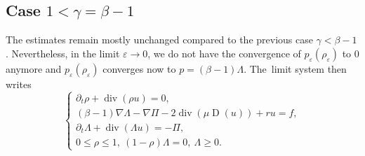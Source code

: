 \documentclass[JEP,XML,SOM,Unicode,NoEqCountersInSection]{cedram}
\newcommand{\<}{\bigl\langle}
\renewcommand{\>}{\bigr\rangle}
\newcommand{\labeleq}[1]{}
\newenvironment{subnumcasess}{\begin{equation*}\begin{cases}}{\end{cases}\end{equation*}}
\theoremstyle{definition}
\theoremstyle{remark}
\DeclareMathOperator{\Div}{div}
\DeclareMathOperator{\D}{D}
\let\ep\varepsilon
\begin{document}
\subsection{Case $1<\gamma = \beta-1$}
The estimates remain mostly unchanged compared to the previous case $\gamma < \beta-1$.
Nevertheless, in the limit $\ep \rightarrow 0$, we do not have the convergence of $p_\ep(\rho_\ep)$ to $0$ anymore and $p_\ep(\rho_\ep)$ converges now to $p = (\beta-1) \Lambda$.
The~limit system then writes
\begin{subnumcasess}{\labeleq{xxx2}}
\partial_t \rho + \Div (\rho u) = 0, \\
(\beta-1)\nabla \Lambda - \nabla \Pi - 2 \Div(\mu \D(u)) + ru = f, \\
\partial_t \Lambda + \Div(\Lambda u) = -\Pi,\\
0 \leq \rho \leq 1, ~(1-\rho)\Lambda = 0,~ \Lambda \geq 0.
\end{subnumcasess}%




\end{document}
